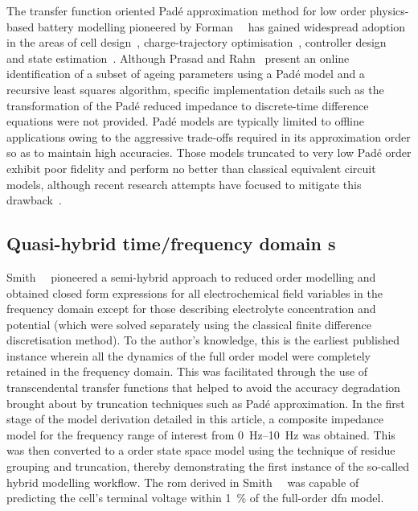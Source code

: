 The     transfer     function     oriented    Padé     approximation     method
for    low    order    physics-based     battery    modelling    pioneered    by
Forman~\etal{}~\cite{Forman2011a}    has   gained    widespread   adoption    in
the    areas     of    cell     design~\cite{Marcicki2013},    charge-trajectory
optimisation~\cite{Bashash2010},    controller    design~\cite{Perez2015}    and
state    estimation~\cite{Marcicki2013,Moura2012}.     Although    Prasad    and
Rahn~\cite{Prasad2013} present  an online identification  of a subset  of ageing
parameters  using  a  Padé  model  and a  recursive  least  squares  algorithm,
specific  implementation  details  such  as  the  transformation  of  the  Padé
reduced  impedance  to discrete-time  difference  equations  were not  provided.
Padé  models  are  typically  limited  to offline  applications  owing  to  the
aggressive  trade-offs required  in its  approximation order  so as  to maintain
high  accuracies.  Those  models  truncated  to very  low  Padé  order  exhibit
poor  fidelity  and   perform  no  better  than   classical  equivalent  circuit
models,  although  recent  research  attempts have  focused  to  mitigate  this
drawback~\cite{Yuan2017a,Yuan2017}.


\subsection{Quasi-hybrid time/frequency domain s}

Smith~\etal{}~\cite{Smith2007} pioneered a semi-hybrid approach to reduced order
modelling and  obtained closed  form expressions  for all  electrochemical field
variables  in  the frequency  domain  except  for those  describing  electrolyte
concentration and  potential (which were  solved separately using  the classical
finite difference discretisation method). To the author's knowledge, this is the
earliest published  instance wherein all  the dynamics  of the full  order model
were completely retained  in the frequency domain. This  was facilitated through
the use of  transcendental transfer functions that helped to  avoid the accuracy
degradation brought about by truncation  techniques such as Padé approximation.
In the first  stage of the model  derivation detailed in this  article, a composite
impedance model for the frequency range of interest from \SIrange{0}{10}{\hertz}
was  obtained.  This was  then  converted  to  a   order  state
space  model using  the technique  of residue  grouping and  truncation, thereby
demonstrating the first instance of the so-called hybrid modelling workflow. The
\gls{rom} derived  in Smith~\etal{}~\cite{Smith2007}  was capable  of predicting
the cell's terminal voltage within  \SI{1}{\percent} of the full-order \gls{dfn}
model.

